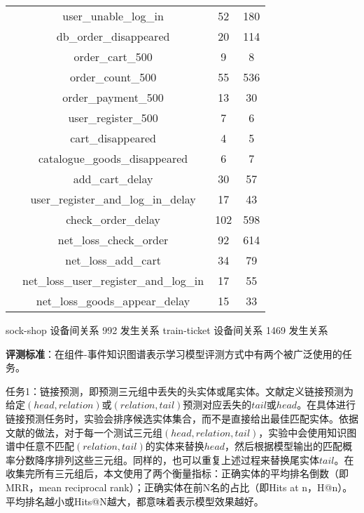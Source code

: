 \begin{table}[htbp]
\begin{tabular}{cccc}
                 & user\_unable\_log\_in                   & 52          & 180       \\
                 & db\_order\_disappeared                  & 20          & 114       \\
                 & order\_cart\_500                        & 9           & 8         \\
                 & order\_count\_500                       & 55          & 536       \\
                 & order\_payment\_500                     & 13          & 30        \\
                 & user\_register\_500                     & 7           & 6         \\
                 & cart\_disappeared                       & 4           & 5         \\
                 & catalogue\_goods\_disappeared           & 6           & 7         \\
                 & add\_cart\_delay                        & 30          & 57        \\
                 & user\_register\_and\_log\_in\_delay     & 17          & 43        \\
                 & check\_order\_delay                     & 102         & 598       \\
                 & net\_loss\_check\_order                 & 92          & 614       \\
                 & net\_loss\_add\_cart                    & 34          & 79        \\
                 & net\_loss\_user\_register\_and\_log\_in & 17          & 55        \\
                 & net\_loss\_goods\_appear\_delay         & 15          & 33        \\ \hline
    \end{tabular}
\end{table}

sock-shop 设备间关系 992  发生关系
train-ticket 设备间关系 1469 发生关系


\textbf{评测标准}：在组件-事件知识图谱表示学习模型评测方式中有两个被广泛使用的任务。

任务1：链接预测，即预测三元组中丢失的头实体或尾实体。文献\parencite{bordes2011learning,bordes2013translatingE}定义链接预测为给定$(head,relation)$或$(relation,tail)$预测对应丢失的$tail$或$head$。在具体进行链接预测任务时，实验会排序候选实体集合，而不是直接给出最佳匹配实体。依据文献\parencite{bordes2013translatingE}的做法，对于每一个测试三元组$(head,relation,tail)$，实验中会使用知识图谱中任意不匹配$(relation,tail)$的实体来替换$head$，然后根据模型输出的匹配概率分数降序排列这些三元组。同样的，也可以重复上述过程来替换尾实体$tail$。在收集完所有三元组后，本文使用了两个衡量指标：正确实体的平均排名倒数（即MRR，mean reciprocal rank）；正确实体在前N名的占比（即Hits at n，H@n）。平均排名越小或Hits@N越大，都意味着表示模型效果越好。

